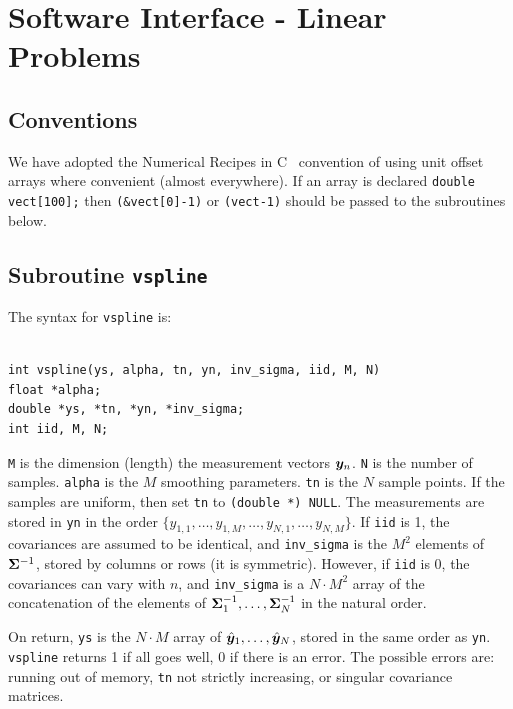 \section{Software Interface - Linear Problems}

\subsection{Conventions}

We have adopted the Numerical Recipes in C~\cite{numrecc:88} convention
of using unit offset arrays
where convenient
(almost everywhere).
If an array is declared
{\tt double vect[100];}
then
{\tt (\&vect[0]-1)} or {\tt (vect-1)}
should be passed to
the subroutines below.


\subsection{Subroutine {\tt vspline}}

The syntax for {\tt vspline} is:

\begin{verbatim}

int vspline(ys, alpha, tn, yn, inv_sigma, iid, M, N)
float *alpha;
double *ys, *tn, *yn, *inv_sigma;
int iid, M, N;

\end{verbatim}


{\tt M} is the dimension (length) the measurement vectors $\bm{y}_n$.
{\tt N} is the number of samples.
{\tt alpha} is the $M$ smoothing parameters.
{\tt tn} is the $N$ sample points.  If the samples are uniform,
then set {\tt tn} to {\tt (double *) NULL}.
The measurements are stored in 
{\tt yn}
in the order
$\{ y_{1,1},\ldots,y_{1,M}, \ldots, y_{N,1},\ldots,y_{N,M} \}$.
If {\tt iid} is 1, the covariances are assumed to be identical,
and {\tt inv\_sigma} is the $M^2$ elements of $\bm{\Sigma}^{-1}$,
stored by columns or rows
(it is symmetric).
However, if {\tt iid} is 0,
the covariances can vary with $n$,
and {\tt inv\_sigma} is a $N \cdot M^2$ array
of the concatenation of the elements of
$\bm{\Sigma}_1^{-1}, \ldots, \bm{\Sigma}_N^{-1}$
in the natural order.

On return,
{\tt ys} is the $N\cdot M$ array of
$\hat{\bm{y}}_1,\ldots,\hat{\bm{y}}_N$,
stored in the same order as {\tt yn}.
{\tt vspline} returns 1 if all goes well,
0 if there is an error.
The possible errors are: running out of memory,
{\tt tn} not strictly increasing,
or singular covariance matrices.

